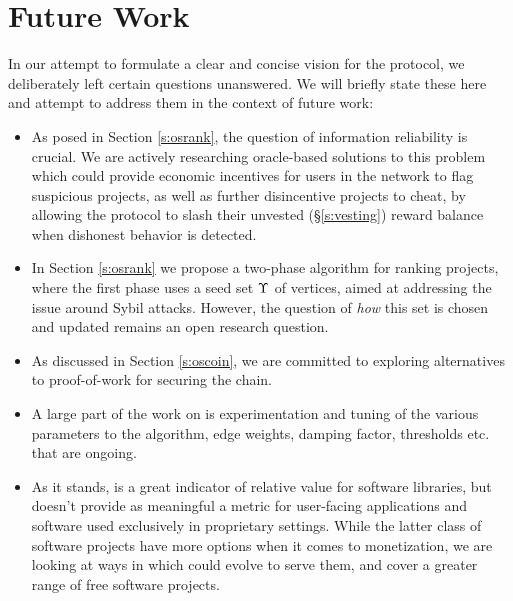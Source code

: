\section{Future Work}
\label{s:future-work}

In our attempt to formulate a clear and concise vision for the \oscoin{}
protocol, we deliberately left certain questions unanswered. We will
briefly state these here and attempt to address them in the context of future work:

\begin{itemize}
\item As posed in Section \ref{s:osrank}, the question of information
reliability is crucial.  We are actively researching oracle-based solutions to
this problem which could provide economic incentives for users in the network
to flag suspicious projects, as well as further disincentive projects to cheat,
by allowing the protocol to slash their unvested (\S\ref{s:vesting}) reward
balance when dishonest behavior is detected.

\item In Section \ref{s:osrank} we propose a two-phase \osrank{} algorithm for
ranking projects, where the first phase uses a seed set $\Upsilon$ of vertices,
aimed at addressing the issue around Sybil attacks.  However, the question of
\emph{how} this set is chosen and updated remains an open research question.

\item As discussed in Section \ref{s:oscoin}, we are committed to exploring
alternatives to proof-of-work for securing the chain.

\item A large part of the work on \osrank{} is experimentation and tuning of the
various parameters to the algorithm, \eg edge weights, damping factor, thresholds
etc. that are ongoing.

\item As it stands, \osrank{} is a great indicator of relative value
for software libraries, but doesn't provide as meaningful a metric for
user-facing applications and software used exclusively in proprietary settings.
While the latter class of software projects have more options when it comes to
monetization, we are looking at ways in which \osrank{} could evolve to serve
them, and cover a greater range of free software projects.

\end{itemize}
